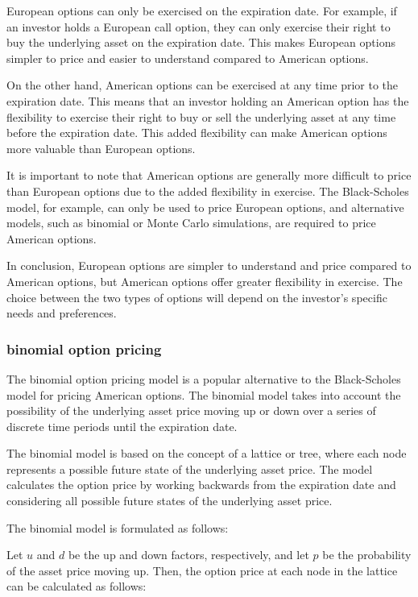 \documentclass[12pt, a4paper, oneside]{article}
\begin{document}
European options can only be exercised on the expiration date. For example, if an investor holds a European call option, they can only exercise their right to buy the underlying asset on the expiration date. This makes European options simpler to price and easier to understand compared to American options.

On the other hand, American options can be exercised at any time prior to the expiration date. This means that an investor holding an American option has the flexibility to exercise their right to buy or sell the underlying asset at any time before the expiration date. This added flexibility can make American options more valuable than European options.

It is important to note that American options are generally more difficult to price than European options due to the added flexibility in exercise. The Black-Scholes model, for example, can only be used to price European options, and alternative models, such as binomial or Monte Carlo simulations, are required to price American options.

In conclusion, European options are simpler to understand and price compared to American options, but American options offer greater flexibility in exercise. The choice between the two types of options will depend on the investor's specific needs and preferences.





\subsubsection{binomial option pricing }
The binomial option pricing model is a popular alternative to the Black-Scholes model for pricing American options. The binomial model takes into account the possibility of the underlying asset price moving up or down over a series of discrete time periods until the expiration date.

The binomial model is based on the concept of a lattice or tree, where each node represents a possible future state of the underlying asset price. The model calculates the option price by working backwards from the expiration date and considering all possible future states of the underlying asset price.

The binomial model is formulated as follows:

Let $u$ and $d$ be the up and down factors, respectively, and let $p$ be the probability of the asset price moving up. Then, the option price at each node in the lattice can be calculated as follows:
\end{document}
